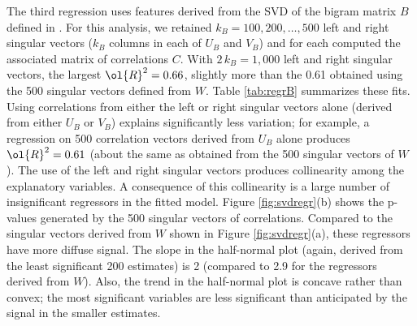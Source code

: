 \documentclass[12pt]{article}
\begin{document}
 The third regression uses features derived from the SVD of the bigram matrix
 $B$ defined in .  For this analysis, we retained $k_B=100, 200, \ldots, 500$ left and right singular vectors ($k_B$ columns in each of $U_B$ and $V_B$) and for each computed the associated matrix of correlations $C$.  With $2 \, k_B = 1,000$ left and right singular vectors, the largest $\ol{R}^2 = 0.66$, slightly more than the 0.61 obtained using the 500 singular vectors defined from $W$.  Table \ref{tab:regrB} summarizes these fits.  Using correlations from either the left or right singular vectors alone (derived from either $U_B$ or $V_B$) explains significantly less variation; for example, a regression on 500 correlation vectors derived from  $U_B$ alone  produces $\ol{R}^2 = 0.61$ (about the same as obtained from the 500 singular vectors of $W$). The use of the left and right singular vectors produces collinearity among the explanatory variables.  A consequence of this collinearity is a large number of insignificant regressors in the fitted model.  Figure \ref{fig:svdregr}(b) shows the p-values generated by the 500 singular vectors of correlations.  Compared to the singular vectors derived from $W$ shown in Figure \ref{fig:svdregr}(a), these regressors have more diffuse signal.  The slope in the half-normal plot (again, derived from the least significant 200 estimates) is 2 (compared to 2.9 for the regressors derived from $W$).  Also, the trend in the half-normal plot is concave rather than convex; the most significant variables are less significant than anticipated by the signal in the smaller estimates.
\end{document}
